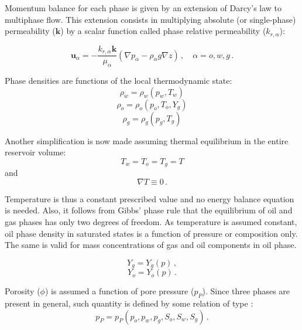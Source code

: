 \documentclass[authoryear,preprint,review,12pt]{elsarticle}
\begin{document}
Momentum balance for each phase is given by an extension of Darcy's law to multiphase flow. This extension consists in multiplying absolute (or single-phase) permeability ($\mathbf{k}$) by a scalar function called phase relative permeability ($k_{r,\alpha}$):

\begin{equation}\label{eq: exdarcy}
\mathbf{u}_\alpha = -\frac{k_{r,\alpha} \mathbf{k}}{\mu_\alpha} \left(\nabla p_\alpha - \rho_\alpha g\nabla z\right) \, , \quad \alpha=o,w,g \, .
\end{equation}

Phase densities are functions of the local thermodynamic state:
\begin{equation}
\rho_w = \rho_w \left(p_w, T_w\right)
\end{equation}
\begin{equation}
\rho_o = \rho_o \left(p_o, T_o,Y_g\right)
\end{equation}
\begin{equation}
\rho_g = \rho_g \left(p_g, T_g\right)
\end{equation}

Another simplification is now made assuming thermal equilibrium in the entire reservoir volume:
\begin{equation}
T_w = T_o = T_g = T
\end{equation}
and
\begin{equation}
\nabla T \equiv 0 \, .
\end{equation}

Temperature is thus a constant prescribed value and no energy balance equation is needed. Also, it follows from Gibbs' phase rule that the equilibrium of oil and gas phases has only two degrees of freedom. As temperature is assumed constant, oil phase density in saturated states is a function of pressure or composition only. The same is valid for mass concentrations of gas and oil components in oil phase.

\begin{equation}
Y_g = Y_g (p) \, ,
\end{equation}
\begin{equation}
Y_o = Y_o (p) \, .
\end{equation}

Porosity ($\phi$) is assumed a function of pore pressure ($p_P$). Since three phases are present in general, such quantity is defined by some relation of type \citep{kim2011rigorous}:
\begin{equation}
p_P=p_P\left(p_o,p_w,p_g,S_o,S_w,S_g\right) \, .
\end{equation}
\end{document}
